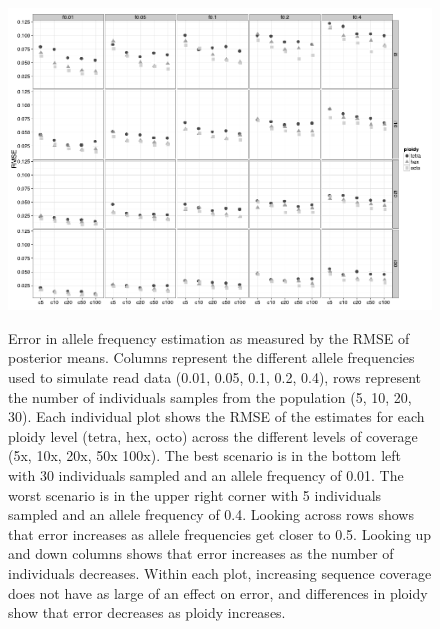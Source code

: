 \documentclass[11pt,english,letterpaper,oneside]{article}
\begin{document}
\begin{figure}
\centering
\caption{Error in allele frequency estimation as measured by the RMSE of posterior means. Columns represent the different allele frequencies used to simulate read data (0.01, 0.05, 0.1, 0.2, 0.4), rows represent the number of individuals samples from the population (5, 10, 20, 30). Each individual plot shows the RMSE of the estimates for each ploidy level (tetra, hex, octo) across the different levels of coverage (5x, 10x, 20x, 50x 100x). The best scenario is in the bottom left with 30 individuals sampled and an allele frequency of 0.01. The worst scenario is in the upper right corner with 5 individuals sampled and an allele frequency of 0.4. Looking across rows shows that error increases as allele frequencies get closer to 0.5. Looking up and down columns shows that error increases as the number of individuals decreases. Within each plot, increasing sequence coverage does not have as large of an effect on error, and differences in ploidy show that error decreases as ploidy increases.}
\vspace{0.25in}
\includegraphics{pdf/fig1}
\label{fig1:rmse}
\end{figure}
\end{document}
